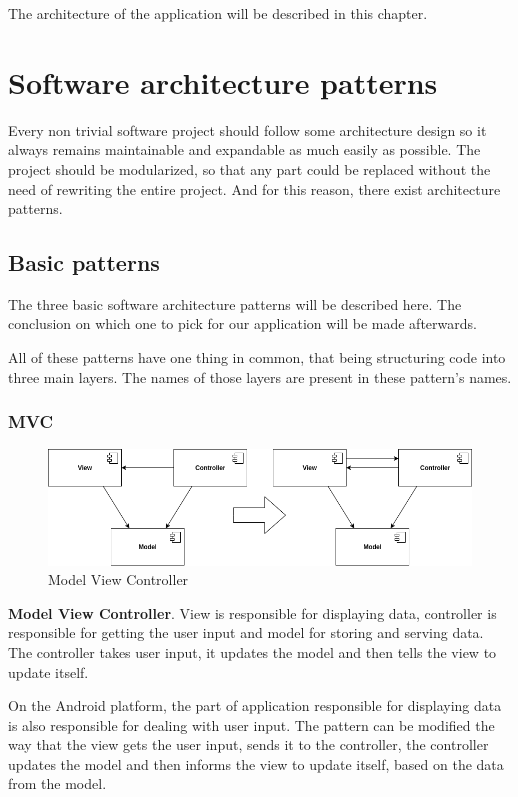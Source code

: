 The architecture of the application will be described in this chapter.

\section{Software architecture patterns}
Every non trivial software project should follow some architecture design so it always remains maintainable and expandable as much easily as possible.
The project should be modularized, so that any part could be replaced without the need of rewriting the entire project.
And for this reason, there exist architecture patterns.

\subsection{Basic patterns}
The three basic software architecture patterns will be described here.
The conclusion on which one to pick for our application will be made afterwards.

All of these patterns have one thing in common, that being structuring code into three main layers.
The names of those layers are present in these pattern's names.

\subsubsection{MVC}

\begin{figure}\centering
	\includegraphics[width=1\textwidth]{pics/patterns/bc-mvc2.png}
	\caption[MVC]{Model View Controller}\label{fig:mvc}
\end{figure}

\textbf{Model View Controller}.
View is responsible for displaying data, controller is responsible for getting the user input and model for storing and serving data.
The controller takes user input, it updates the model and then tells the view to update itself. \cite{droidcon}

On the Android platform, the part of application responsible for displaying data is also responsible for dealing with user input.
The pattern can be modified the way that the view gets the user input, sends it to the controller, the controller updates the model and then informs the view to update itself, based on the data from the model. \cite{droidcon}

